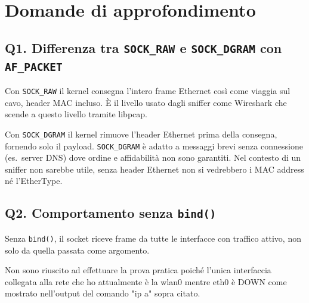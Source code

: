 \documentclass[a4paper,12pt]{article}
\begin{document}
\section{Domande di approfondimento}

\subsection*{Q1. Differenza tra \texttt{SOCK\_RAW} e \texttt{SOCK\_DGRAM} con \texttt{AF\_PACKET}}

Con \texttt{SOCK\_RAW} il kernel consegna l'intero frame Ethernet così come viaggia sul
cavo, header MAC incluso. È il livello usato dagli sniffer come Wireshark 
che scende a questo livello tramite libpcap.

Con \texttt{SOCK\_DGRAM} il kernel rimuove l'header Ethernet prima della consegna,
fornendo solo il payload. \texttt{SOCK\_DGRAM} è adatto a messaggi brevi senza
connessione (es.\ server DNS) dove ordine e affidabilità non sono garantiti.
Nel contesto di un sniffer non sarebbe utile, senza header Ethernet non si vedrebbero
i MAC address né l'EtherType.

\subsection*{Q2. Comportamento senza \texttt{bind()}}

Senza \texttt{bind()}, il socket riceve frame da tutte le interfacce con traffico attivo,
non solo da quella passata come argomento.

Non sono riuscito ad effettuare la prova pratica poiché l'unica interfaccia
collegata alla rete che ho attualmente è la wlan0 mentre eth0 è DOWN come
mostrato nell'output del comando "ip a" sopra citato.
\end{document}
